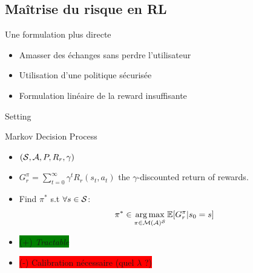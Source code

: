 \documentclass[french,handout]{beamer}
\begin{document}
    \subsection{Maîtrise du risque en RL}

    \begin{frame}{Une formulation plus directe}

        \begin{itemize}
            \item Amasser des échanges sans perdre l'utilisateur%
            \item Utilisation d'une politique sécurisée %
            \item Formulation linéaire de la reward insuffisante
        \end{itemize}


    \end{frame}

    \begin{frame}{Setting}
        \begin{block}{Markov Decision Process}
            \begin{itemize}
                \pause\item $(\mathcal{S}, \mathcal{A}, P, R_r, \gamma)$
                \pause\item $G_r^\pi = \sum_{t=0}^\infty \gamma^t R_r(s_t, a_t)$ the $\gamma$-discounted return of rewards.
                \pause\item Find $\pi^*$ s.t $\forall s\in\mathcal{S}$:
                \begin{equation}
                    \label{eq:mdp}
                    \begin{array}{lcr}
                        \displaystyle \pi^* \in \operatorname*{arg\,max}_{\pi\in\mathcal{M}(\mathcal{A})^{\mathcal{S}}} \operatorname*{\mathbb{E}}[G_r^\pi | s_0=s]
                    \end{array}
                \end{equation}

            \end{itemize}
        \end{block}


        \begin{block}{}
            \begin{itemize}
                \item \colorbox{green}{(+) \textit{Tractable}}
                \item \colorbox{red}{(-) Calibration nécessaire (quel $\lambda$ ?)}
            \end{itemize}
        \end{block}

    \end{frame}
\end{document}
